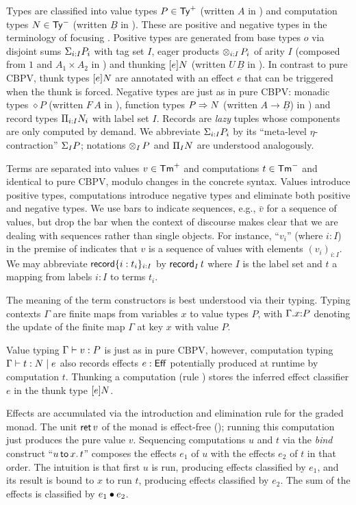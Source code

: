 \documentclass[acmsmall,review,anonymous]{acmart}\settopmatter{printfolios=true,printccs=false,printacmref=false}
\theoremstyle{remark}
\begin{document}
Types are classified into value types $P \in \PTy$ (written $A$ in
\citet{levy:hosc06}) and computation types $N \in \NTy$
(written $\underline B$ in
\loccit).  These are positive and negative types in the terminology of
focusing \cite{zeilberger:PhD}.
Positive types are generated from base types $o$ via
disjoint sums $\sumty i I P$ with tag set $I$, eager products $\tupty
i I P$ of arity $I$ (composed
from $1$ and $A_1 \times A_2$ in \loccit) and thunking $\thunkty e N$
(written $U\,\underline B$ in \loccit).  In contrast to pure CBPV,
thunk types $\thunkty e N$ are annotated with an effect $e$ that can
be triggered when the thunk is forced.  Negative types are just as in
pure CBPV: monadic types $\diamond P$ (written $F\,A$ in \loccit),
function types $P \To N$ (written $A \to \underline B$) in \loccit)
and record types $\recty i I N$ with label set $I$.
Records are \emph{lazy} tuples whose components are only computed by demand.
We abbreviate $\sumty i I P$ by its ``meta-level $\eta$-contraction''
$\sumt I P$; notations $\tupt I P$ and
$\rect I N$ are understood analogously.

Terms are separated into values $v \in \PTm$ and computations $t \in
\NTm$ and identical to pure CBPV, modulo changes in the concrete
syntax.  Values introduce positive types,
computations introduce
negative types and
eliminate both positive and negative types.
We use bars to indicate sequences, e.g., $\bar v$ for a
sequence of values, but drop the bar when the context of discourse
makes clear that we are dealing with sequences rather than single
objects.  For instance, ``$v_i$'' (where $i : I$) in the premise of
\rintro\otimes indicates that $v$ is a sequence of values with
elements $(v_i)_{i:I}$.  We may abbreviate $\trecord \{i :
t_i\}_{i:I}$ by $\recrd I t$ where $I$ is the label set and $t$ a
mapping from labels $i:I$ to terms $t_i$.

The meaning of the term constructors is best understood via their
typing.  Typing contexts $\Gamma$ are finite maps from variables $x$
to value types $P$, with $\ext \Gamma x P$ denoting the update of the
finite map $\Gamma$ at key $x$ with value $P$.

Value typing $\ValTy \Gamma v P$ is just as in pure CBPV, however,
computation typing $\CompTy \Gamma t e N$ also records effects $e :
\Eff$ potentially produced at runtime by computation $t$.  Thunking a
computation (rule \rintro\Box) stores the inferred effect classifier
$e$ in the thunk type $\thunkty e N$.

Effects are accumulated via the introduction and elimination rule for
the graded monad.  The unit $\ret v$ of the monad is effect-free
(\rintro\diamond); running this computation just produces the pure
value $v$.  Sequencing computations $u$ and $t$ via the \emph{bind}
construct ``$\bind x u t$'' composes the effects $e_1$ of $u$ with the
effects $e_2$ of $t$ in that order.  The intuition is that first $u$
is run, producing effects classified by $e_1$, and its result is bound
to $x$ to run $t$, producing effects classified by $e_2$.  The sum of
the effects is classified by $e_1 \bu e_2$.
\end{document}
